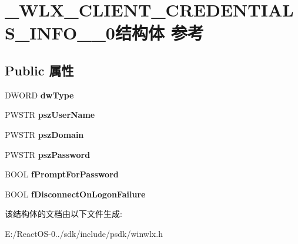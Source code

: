 \hypertarget{struct___w_l_x___c_l_i_e_n_t___c_r_e_d_e_n_t_i_a_l_s___i_n_f_o__2__0}{}\section{\+\_\+\+W\+L\+X\+\_\+\+C\+L\+I\+E\+N\+T\+\_\+\+C\+R\+E\+D\+E\+N\+T\+I\+A\+L\+S\+\_\+\+I\+N\+F\+O\+\_\+\_\+0结构体 参考}
\label{struct___w_l_x___c_l_i_e_n_t___c_r_e_d_e_n_t_i_a_l_s___i_n_f_o__2__0}
\subsection*{Public 属性}
\begin{DoxyCompactItemize}
\item 
\mbox{\label{struct___w_l_x___c_l_i_e_n_t___c_r_e_d_e_n_t_i_a_l_s___i_n_f_o__2__0_a33d85be77929c18707e58fa9f2f83edd}} 
D\+W\+O\+RD {\bfseries dw\+Type}
\item 
\mbox{\label{struct___w_l_x___c_l_i_e_n_t___c_r_e_d_e_n_t_i_a_l_s___i_n_f_o__2__0_a9bb87c3f020eefc10b2ad818dc9a270e}} 
P\+W\+S\+TR {\bfseries psz\+User\+Name}
\item 
\mbox{\label{struct___w_l_x___c_l_i_e_n_t___c_r_e_d_e_n_t_i_a_l_s___i_n_f_o__2__0_a1206a09fdea56b4b87c00f5fb63fa3c6}} 
P\+W\+S\+TR {\bfseries psz\+Domain}
\item 
\mbox{\label{struct___w_l_x___c_l_i_e_n_t___c_r_e_d_e_n_t_i_a_l_s___i_n_f_o__2__0_a8a962e99559f12e807abffadc7d260e9}} 
P\+W\+S\+TR {\bfseries psz\+Password}
\item 
\mbox{\label{struct___w_l_x___c_l_i_e_n_t___c_r_e_d_e_n_t_i_a_l_s___i_n_f_o__2__0_aa42b71593e617ffd384b49a3f8b00964}} 
B\+O\+OL {\bfseries f\+Prompt\+For\+Password}
\item 
\mbox{\label{struct___w_l_x___c_l_i_e_n_t___c_r_e_d_e_n_t_i_a_l_s___i_n_f_o__2__0_addfa66b5dea7d3661c9c0e350e25afc6}} 
B\+O\+OL {\bfseries f\+Disconnect\+On\+Logon\+Failure}
\end{DoxyCompactItemize}


该结构体的文档由以下文件生成\+:\begin{DoxyCompactItemize}
\item 
E\+:/\+React\+O\+S-\/0../sdk/include/psdk/winwlx.\+h\end{DoxyCompactItemize}
